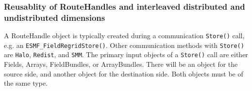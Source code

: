  
\setlength{\oldparskip}{\parskip}
\setlength{\parskip}{1.5ex}
\setlength{\oldparindent}{\parindent}
\setlength{\parindent}{0pt}
\setlength{\oldbaselineskip}{\baselineskip}
\setlength{\baselineskip}{11pt}
 
\def\bv{\begin{verbatim}}
\def\ev{\end{verbatim}}
\def\be{\begin{equation}}
\def\ee{\end{equation}}
\def\bea{\begin{eqnarray}}
\def\eea{\end{eqnarray}}
\def\bi{\begin{itemize}}
\def\ei{\end{itemize}}
\def\bn{\begin{enumerate}}
\def\en{\end{enumerate}}
\def\bd{\begin{description}}
\def\ed{\end{description}}
\def\({\left (}
\def\){\right )}
\def\[{\left [}
\def\]{\right ]}
\def\<{\left  \langle}
\def\>{\right \rangle}
\def\cI{{\cal I}}
\def\diag{\mathop{\rm diag}}
\def\tr{\mathop{\rm tr}}


 

   \subsubsection{Reusablity of RouteHandles and interleaved distributed 
   and undistributed dimensions}
   \label{RH:Reusability}
  
   A RouteHandle object is typically created during a communication {\tt Store()}
   call, e.g. an {\tt ESMF\_FieldRegridStore()}. Other communication methods
   with {\tt Store()} are {\tt Halo}, {\tt Redist}, and {\tt SMM}. The primary
   input objects of a {\tt Store()} call are either Fields, Arrays,
   FieldBundles, or ArrayBundles. There will be an object for the source side,
   and another object for the destination side. Both objects must be of the
   same type. 

